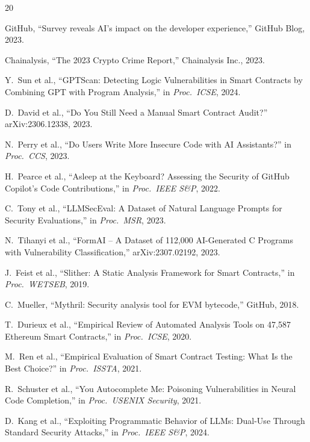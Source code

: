 \documentclass[11pt]{article}
\begin{document}
\begin{thebibliography}{20}

 GitHub, ``Survey reveals AI's impact on the developer experience,'' GitHub Blog, 2023.

 Chainalysis, ``The 2023 Crypto Crime Report,'' Chainalysis Inc., 2023.

 Y.~Sun et al., ``GPTScan: Detecting Logic Vulnerabilities in Smart Contracts by Combining GPT with Program Analysis,'' in \textit{Proc.\ ICSE}, 2024.

 D.~David et al., ``Do You Still Need a Manual Smart Contract Audit?'' arXiv:2306.12338, 2023.

 N.~Perry et al., ``Do Users Write More Insecure Code with AI Assistants?'' in \textit{Proc.\ CCS}, 2023.

 H.~Pearce et al., ``Asleep at the Keyboard? Assessing the Security of GitHub Copilot's Code Contributions,'' in \textit{Proc.\ IEEE S\&P}, 2022.

 C.~Tony et al., ``LLMSecEval: A Dataset of Natural Language Prompts for Security Evaluations,'' in \textit{Proc.\ MSR}, 2023.

 N.~Tihanyi et al., ``FormAI -- A Dataset of 112,000 AI-Generated C Programs with Vulnerability Classification,'' arXiv:2307.02192, 2023.

 J.~Feist et al., ``Slither: A Static Analysis Framework for Smart Contracts,'' in \textit{Proc.\ WETSEB}, 2019.

 C.~Mueller, ``Mythril: Security analysis tool for EVM bytecode,'' GitHub, 2018.

 T.~Durieux et al., ``Empirical Review of Automated Analysis Tools on 47,587 Ethereum Smart Contracts,'' in \textit{Proc.\ ICSE}, 2020.

 M.~Ren et al., ``Empirical Evaluation of Smart Contract Testing: What Is the Best Choice?'' in \textit{Proc.\ ISSTA}, 2021.

 R.~Schuster et al., ``You Autocomplete Me: Poisoning Vulnerabilities in Neural Code Completion,'' in \textit{Proc.\ USENIX Security}, 2021.

 D.~Kang et al., ``Exploiting Programmatic Behavior of LLMs: Dual-Use Through Standard Security Attacks,'' in \textit{Proc.\ IEEE S\&P}, 2024.


\end{thebibliography}
\end{document}
